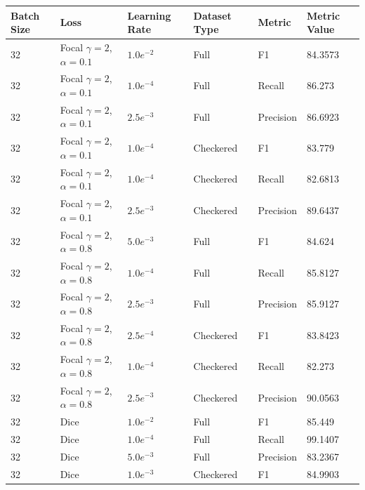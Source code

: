 \begin{table}[H]
\footnotesize
\begin{center}
\begin{tabular}{|l|l|l|l|l|l|}

\hline
\textbf{Batch Size} & \textbf{Loss} & \textbf{Learning Rate} & \textbf{Dataset Type} &\textbf{Metric} & \textbf{Metric Value} \\
\hline
32  & Focal $\gamma = 2$, $\alpha = 0.1$  & $1.0e^{-2}$& Full      & F1        & 84.3573  \\
\hline
32  & Focal $\gamma = 2$, $\alpha = 0.1$  & $1.0e^{-4}$& Full      & Recall    & 86.273   \\
\hline
32  & Focal $\gamma = 2$, $\alpha = 0.1$  & $2.5e^{-3}$& Full      & Precision & 86.6923  \\
\hline
32  & Focal $\gamma = 2$, $\alpha = 0.1$  & $1.0e^{-4}$& Checkered & F1        & 83.779   \\
\hline
32  & Focal $\gamma = 2$, $\alpha = 0.1$  & $1.0e^{-4}$& Checkered & Recall    & 82.6813  \\
\hline
32  & Focal $\gamma = 2$, $\alpha = 0.1$  & $2.5e^{-3}$& Checkered & Precision & 89.6437  \\
\hline
32  & Focal $\gamma = 2$, $\alpha = 0.8$  & $5.0e^{-3}$& Full      & F1        & 84.624   \\
\hline
32  & Focal $\gamma = 2$, $\alpha = 0.8$  & $1.0e^{-4}$& Full      & Recall    & 85.8127  \\
\hline
32  & Focal $\gamma = 2$, $\alpha = 0.8$  & $2.5e^{-3}$& Full      & Precision & 85.9127  \\
\hline
32  & Focal $\gamma = 2$, $\alpha = 0.8$  & $2.5e^{-4}$& Checkered & F1        & 83.8423  \\
\hline
32  & Focal $\gamma = 2$, $\alpha = 0.8$  & $1.0e^{-4}$& Checkered & Recall    & 82.273   \\
\hline
32  & Focal $\gamma = 2$, $\alpha = 0.8$  & $2.5e^{-3}$& Checkered & Precision & 90.0563  \\
\hline
32  & Dice                                & $1.0e^{-2}$& Full      & F1            & 85.449   \\
\hline
32  & Dice                                & $1.0e^{-4}$& Full      & Recall        & 99.1407  \\
\hline
32  & Dice                                & $5.0e^{-3}$& Full      & Precision     & 83.2367  \\
\hline
32  & Dice                                & $1.0e^{-3}$& Checkered & F1            & 84.9903  \\

\end{tabular}
\end{center}
\end{table}
